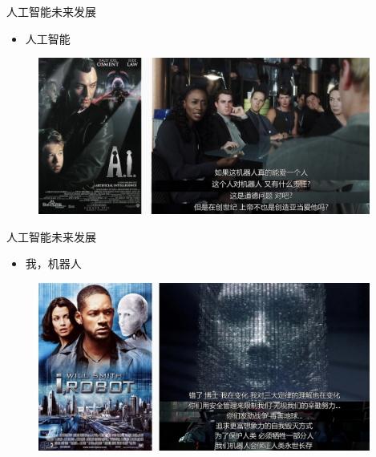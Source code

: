 \documentclass{beamer}
\begin{document}
   \begin{frame}{人工智能未来发展}
    \begin{itemize}
     \item 人工智能
    \end{itemize}
   \begin{figure}[H]
   \centering
   \includegraphics[width=4.3in]{cdjPic4.jpg}
   \end{figure}
  \end{frame}

   \begin{frame}{人工智能未来发展}
    \begin{itemize}
     \item 我，机器人
    \end{itemize}
   \begin{figure}[H]
   \centering
   \includegraphics[width=4.3in]{cdjPic3.jpg}
   \end{figure}
  \end{frame}
\end{document}
